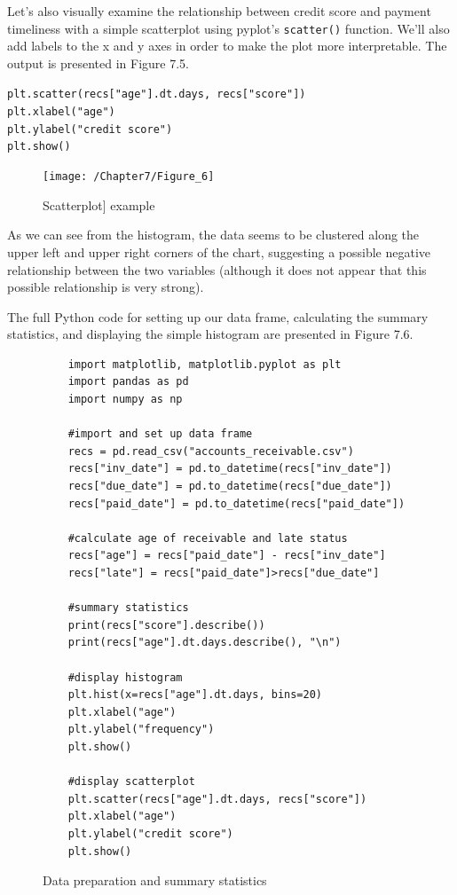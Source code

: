 \documentclass{book}
\begin{document}
Let's also visually examine the relationship between credit score and payment timeliness with a simple scatterplot using pyplot's \texttt{scatter()} function. We'll also add labels to the x and y axes in order to make the plot more interpretable. The output is presented in Figure 7.5.

\texttt{plt.scatter(recs["age"].dt.days, recs["score"])\\
	plt.xlabel("age")\\
	plt.ylabel("credit score")\\
	plt.show()
}

\begin{figure}[h]
	\caption{Scatterplot] example}
	\centering\texttt{[image: /Chapter7/Figure\_6]}
\end{figure}

As we can see from the histogram, the data seems to be clustered along the upper left and upper right corners of the chart, suggesting a possible negative relationship between the two variables (although it does not appear that this possible relationship is very strong).

The full Python code for setting up our data frame, calculating the summary statistics, and displaying the simple histogram are presented in Figure 7.6.

\begin{figure}[h]
	\caption{Data preparation and summary statistics}
	\begin{lstlisting}
	import matplotlib, matplotlib.pyplot as plt
	import pandas as pd
	import numpy as np
	
	#import and set up data frame
	recs = pd.read_csv("accounts_receivable.csv")
	recs["inv_date"] = pd.to_datetime(recs["inv_date"])
	recs["due_date"] = pd.to_datetime(recs["due_date"])
	recs["paid_date"] = pd.to_datetime(recs["paid_date"])
	
	#calculate age of receivable and late status
	recs["age"] = recs["paid_date"] - recs["inv_date"]
	recs["late"] = recs["paid_date"]>recs["due_date"]
	
	#summary statistics
	print(recs["score"].describe())
	print(recs["age"].dt.days.describe(), "\n")
	
	#display histogram
	plt.hist(x=recs["age"].dt.days, bins=20)
	plt.xlabel("age")
	plt.ylabel("frequency")
	plt.show()
	
	#display scatterplot
	plt.scatter(recs["age"].dt.days, recs["score"])
	plt.xlabel("age")
	plt.ylabel("credit score")
	plt.show()
	\end{lstlisting}
\end{figure}
\end{document}
